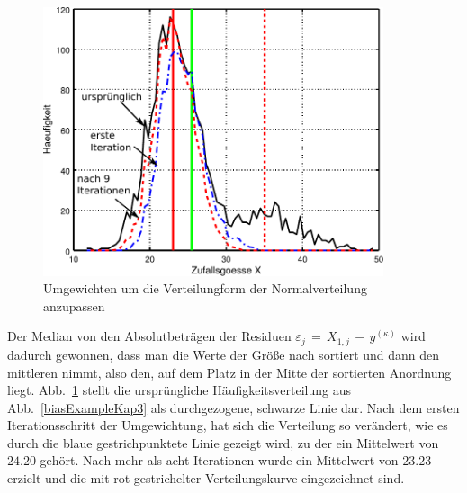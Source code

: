 \begin{figure}
\begin{center}
\includegraphics[width=100mm]{03_vorlesung/media/learn_robust_2.pdf}
\caption{\label{RobustIter} Umgewichten um die Verteilungform der Normalverteilung anzupassen}
\end{center}
\end{figure}

Der Median von den Absolutbeträgen der Residuen $\varepsilon_j \, = \, X_{1,j} \, - \, y^{(\kappa)}$ wird dadurch gewonnen,
dass man die Werte der Größe nach sortiert und dann den mittleren nimmt, also den, auf dem Platz in der Mitte der sortierten
Anordnung liegt.
Abb.~\ref{RobustIter} stellt die ursprüngliche Häufigkeitsverteilung aus Abb.~\ref{biasExampleKap3} als
durchgezogene, schwarze Linie dar. Nach dem ersten Iterationsschritt der Umgewichtung, hat sich die Verteilung so verändert,
wie es durch die blaue gestrichpunktete Linie gezeigt wird, zu der ein Mittelwert von $24.20$ gehört. Nach mehr als acht Iterationen
wurde ein Mittelwert von $23.23$ erzielt und die mit rot gestrichelter Verteilungskurve eingezeichnet sind.

